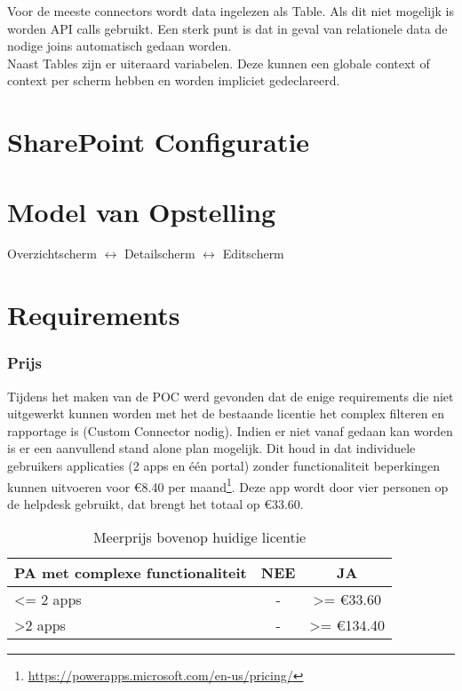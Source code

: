 Voor de meeste connectors wordt data ingelezen als Table. Als dit niet mogelijk is worden API calls gebruikt. Een sterk punt is dat in geval van relationele data de nodige joins automatisch gedaan worden. \autocite{Lindhorst2018}\\
Naast Tables zijn er uiteraard variabelen. Deze kunnen een globale context of context per scherm hebben en worden impliciet gedeclareerd.

\section{SharePoint Configuratie}
\label{sec:sharepoint}


\section{Model van Opstelling}


Overzichtscherm $\leftrightarrow$ Detailscherm $\leftrightarrow$ Editscherm

\section{Requirements}

\subsubsection{Prijs}

Tijdens het maken van de POC werd gevonden dat de enige requirements die niet uitgewerkt kunnen worden met het de bestaande licentie het complex filteren en rapportage is (Custom Connector nodig). Indien er niet vanaf gedaan kan worden is er een aanvullend stand alone plan mogelijk. Dit houd in dat individuele gebruikers applicaties (2 apps en één portal) zonder functionaliteit beperkingen kunnen uitvoeren voor \euro 8.40 per maand\footnote{\url{https://powerapps.microsoft.com/en-us/pricing/}}. Deze app wordt door vier personen op de helpdesk gebruikt, dat brengt het totaal op \euro 33.60.

\begin{table}[h!]
    \begin{tabular}{|l|c|c|}
        \hline
        \textbf{PA met complexe functionaliteit} & \textbf{NEE} & \textbf{JA}             \\ \hline
        \textless{}= 2 apps                      & -            & \textgreater{}= \euro 33.60  \\ \hline
        \textgreater 2 apps                      & -            & \textgreater{}= \euro 134.40 \\ \hline
    \end{tabular}
    \caption{Meerprijs bovenop huidige licentie}
\end{table}

